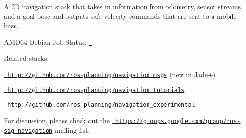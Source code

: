 A 2D navigation stack that takes in information from odometry, sensor streams, and a goal pose and outputs safe velocity commands that are sent to a mobile base.


\begin{DoxyItemize}
\item A\+M\+D64 Debian Job Status\+: \href{http://build.ros.org/job/Mbin_uB64__navigation__ubuntu_bionic_amd64__binary/}{\texttt{ }}
\end{DoxyItemize}

Related stacks\+:


\begin{DoxyItemize}
\item \href{http://github.com/ros-planning/navigation_msgs}{\texttt{ http\+://github.\+com/ros-\/planning/navigation\+\_\+msgs}} (new in Jade+)
\item \href{http://github.com/ros-planning/navigation_tutorials}{\texttt{ http\+://github.\+com/ros-\/planning/navigation\+\_\+tutorials}}
\item \href{http://github.com/ros-planning/navigation_experimental}{\texttt{ http\+://github.\+com/ros-\/planning/navigation\+\_\+experimental}}
\end{DoxyItemize}

For discussion, please check out the \href{https://groups.google.com/group/ros-sig-navigation}{\texttt{ https\+://groups.\+google.\+com/group/ros-\/sig-\/navigation}} mailing list. 